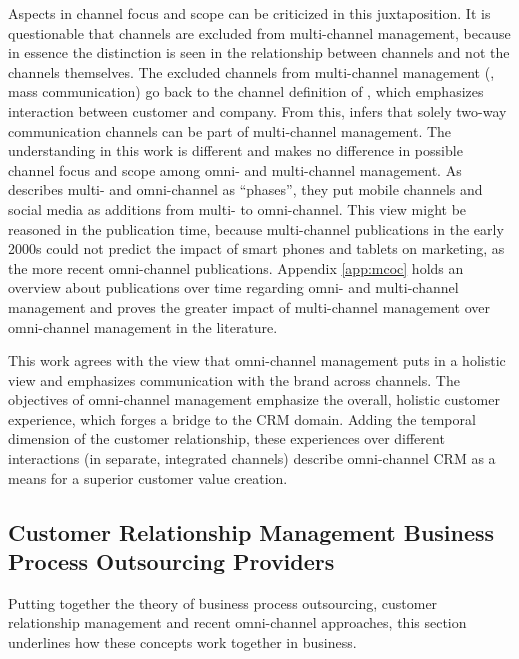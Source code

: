 	 Aspects in channel focus and scope can be criticized in this juxtaposition. It is questionable that channels are excluded from multi-channel management, because in essence the distinction is seen in the relationship between channels and not the channels themselves. The excluded channels from multi-channel management (\viz, mass communication) go back to the channel definition of \citeauthor{Neslin2006}, which emphasizes interaction between customer and company. From this, \citeauthor{vorhoef2015retail} infers that solely two-way communication channels can be part of multi-channel management. The understanding in this work is different and makes no difference in possible channel focus and scope among omni- and multi-channel management. As \citeauthor{vorhoef2015retail} describes multi- and omni-channel as \enquote{phases}, they put mobile channels and social media as additions from multi- to omni-channel. This view might be reasoned in the publication time, because multi-channel publications in the early 2000s could not predict the impact of smart phones and tablets on marketing, as the more recent omni-channel publications. Appendix \ref{app:mcoc} holds an overview about publications over time regarding omni- and multi-channel management and proves the greater impact of multi-channel management over omni-channel management in the literature. 
	 
	 This work agrees with the view that omni-channel management puts in a holistic view and emphasizes communication with the brand across channels. The objectives of omni-channel management emphasize the overall, holistic customer experience, which forges a bridge to the \acrshort{CRM} domain. Adding the temporal dimension of the customer relationship, these experiences over different interactions (in separate, integrated channels) describe omni-channel \acrshort{CRM} as a means for a superior customer value creation. 
	 
		\subsection{Customer Relationship Management Business Process Outsourcing Providers}
		\label{sec:bpocrmis}
		Putting together the theory of business process outsourcing, customer relationship management and recent omni-channel approaches, this section underlines how these concepts work together in business. 
		
